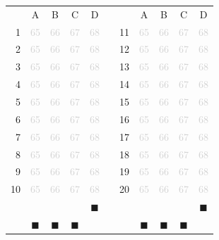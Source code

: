 \documentclass[a4paper,11pt]{article}
\newcommand{\light}[1]{\textcolor{lightgray}{#1}}
\begin{document}
\begin{center}
\large
\begin{tabular}{r|c|c|c|c|p{0.3cm}r|c|c|c|c|}
\multicolumn{1}{c}{} &
\multicolumn{1}{c}{A}&
\multicolumn{1}{c}{B}&
\multicolumn{1}{c}{C}&
\multicolumn{1}{c}{D}& \multicolumn{2}{c}{} &
\multicolumn{1}{c}{A}&
\multicolumn{1}{c}{B}&
\multicolumn{1}{c}{C}&
\multicolumn{1}{c}{D}\\ 
\cline{2-5} \cline{8-11}
1& \light{65} & \light{66} & \light{67} & \light{68} & & 11& \light{65} & \light{66} & \light{67} & \light{68} \\ 
\cline{2-5} \cline{8-11}
2& \light{65} & \light{66} & \light{67} & \light{68} & & 12& \light{65} & \light{66} & \light{67} & \light{68} \\ 
\cline{2-5} \cline{8-11}
3& \light{65} & \light{66} & \light{67} & \light{68} & & 13& \light{65} & \light{66} & \light{67} & \light{68} \\ 
\cline{2-5} \cline{8-11}
4& \light{65} & \light{66} & \light{67} & \light{68} & & 14& \light{65} & \light{66} & \light{67} & \light{68} \\ 
\cline{2-5} \cline{8-11}
5& \light{65} & \light{66} & \light{67} & \light{68} & & 15& \light{65} & \light{66} & \light{67} & \light{68} \\ 
\cline{2-5} \cline{8-11}
6& \light{65} & \light{66} & \light{67} & \light{68} & & 16& \light{65} & \light{66} & \light{67} & \light{68} \\ 
\cline{2-5} \cline{8-11}
7& \light{65} & \light{66} & \light{67} & \light{68} & & 17& \light{65} & \light{66} & \light{67} & \light{68} \\ 
\cline{2-5} \cline{8-11}
8& \light{65} & \light{66} & \light{67} & \light{68} & & 18& \light{65} & \light{66} & \light{67} & \light{68} \\ 
\cline{2-5} \cline{8-11}
9& \light{65} & \light{66} & \light{67} & \light{68} & & 19& \light{65} & \light{66} & \light{67} & \light{68} \\ 
\cline{2-5} \cline{8-11}
10& \light{65} & \light{66} & \light{67} & \light{68} & & 20& \light{65} & \light{66} & \light{67} & \light{68} \\ 
\cline{2-5} \cline{8-11}
\multicolumn{1}{c}{} & \multicolumn{1}{c}{} & \multicolumn{1}{c}{} & \multicolumn{1}{c}{} & \multicolumn{1}{c}{$\blacksquare$} & \multicolumn{2}{c}{} & \multicolumn{1}{c}{} & \multicolumn{1}{c}{} & \multicolumn{1}{c}{} & \multicolumn{1}{c}{$\blacksquare$}\\ 
\multicolumn{1}{c}{} & \multicolumn{1}{c}{$\blacksquare$} & \multicolumn{1}{c}{$\blacksquare$} & \multicolumn{1}{c}{$\blacksquare$} & \multicolumn{1}{c}{} & \multicolumn{2}{c}{} & \multicolumn{1}{c}{$\blacksquare$} & \multicolumn{1}{c}{$\blacksquare$} & \multicolumn{1}{c}{$\blacksquare$} & \multicolumn{1}{c}{}\\ 
\end{tabular}
\end{center}
\end{document}

